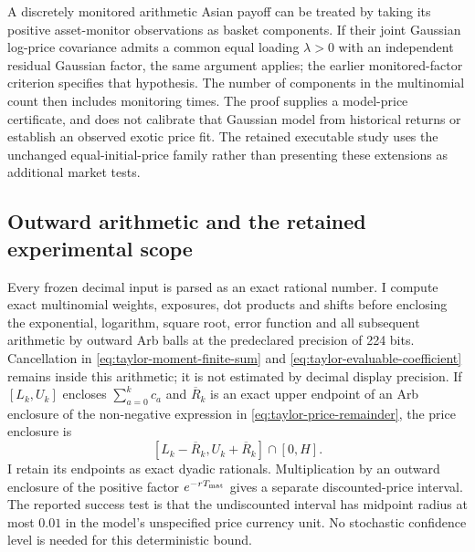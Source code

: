 A discretely monitored arithmetic Asian payoff can be treated by taking
its positive asset-monitor observations as basket components. If their joint
Gaussian log-price covariance admits a common equal loading $\lambda>0$
with an independent residual Gaussian factor, the same argument applies;
the earlier monitored-factor criterion specifies that hypothesis.
The number of components in the multinomial count then includes monitoring
times. The proof supplies a model-price certificate, and does not calibrate
that Gaussian model from historical returns or establish an observed exotic
price fit. The retained executable study uses the unchanged equal-initial-price
family rather than presenting these extensions as additional market tests.

\subsection{Outward arithmetic and the retained experimental scope}
\label{sec:taylor-outward-scope}

Every frozen decimal input is parsed as an exact rational number. I compute exact multinomial weights, exposures, dot products and shifts before enclosing the exponential, logarithm, square root, error function and all subsequent arithmetic by outward Arb balls at the predeclared precision of 224 bits. Cancellation in \eqref{eq:taylor-moment-finite-sum} and \eqref{eq:taylor-evaluable-coefficient} remains inside this arithmetic; it is not estimated by decimal display precision. If $[L_k,U_k]$ encloses $\sum_{a=0}^k c_a$ and $\overline R_k$ is an exact upper endpoint of an Arb enclosure of the non-negative expression in \eqref{eq:taylor-price-remainder}, the price enclosure is
\[
 [L_k-\overline R_k,U_k+\overline R_k]\cap[0,H].
\]
I retain its endpoints as exact dyadic rationals. Multiplication by an outward enclosure of the positive factor $e^{-rT_{\rm mat}}$ gives a separate discounted-price interval. The reported success test is that the undiscounted interval has midpoint radius at most $0.01$ in the model's unspecified price currency unit. No stochastic confidence level is needed for this deterministic bound.


